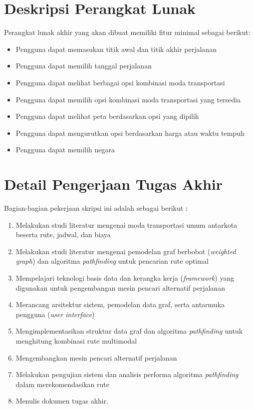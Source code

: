 \documentclass[a4paper,twoside]{article}
\begin{document}
	\section{Deskripsi Perangkat Lunak}
	Perangkat lunak akhir yang akan dibuat memiliki fitur minimal sebagai berikut:
	\begin{itemize}
		\item Pengguna dapat memasukan titik awal dan titik akhir perjalanan
        \item Pengguna dapat memilih tanggal perjalanan
		\item Pengguna dapat melihat berbagai opsi kombinasi moda transportasi
		\item Pengguna dapat memilih opsi kombinasi moda transportasi yang tersedia
		\item Pengguna dapat melihat peta berdasarkan opsi yang dipilih
        \item Pengguna dapat mengurutkan opsi berdasarkan harga atau waktu tempuh
        \item Pengguna dapat memilih negara
	\end{itemize}
	
	\section{Detail Pengerjaan Tugas Akhir}
	Bagian-bagian pekerjaan skripsi ini adalah sebagai berikut :
	\begin{enumerate}
		\item Melakukan studi literatur mengenai moda transportasi umum antarkota beserta rute, jadwal, dan biaya
		\item Melakukan studi literatur mengenai pemodelan graf berbobot (\textit{weighted graph}) dan algoritma \textit{pathfinding} untuk pencarian rute optimal
		\item Mempelajari teknologi basis data dan kerangka kerja (\textit{framework}) yang digunakan untuk pengembangan mesin pencari alternatif perjalanan
		\item Merancang arsitektur sistem, pemodelan data graf, serta antarmuka pengguna (\textit{user interface})
		\item Mengimplementasikan struktur data graf dan algoritma \textit{pathfinding} untuk menghitung kombinasi rute multimodal
		\item Mengembangkan mesin pencari alternatif perjalanan
		\item Melakukan pengujian sistem dan analisis performa algoritma \textit{pathfinding} dalam merekomendasikan rute
		\item Menulis dokumen tugas akhir.
	\end{enumerate}
	
\end{document}
